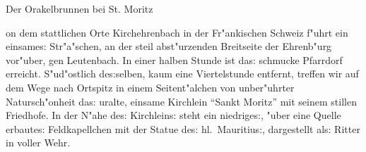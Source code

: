 \documentclass[a4paper]{article}
\begin{document}
\begin{minipage}{9.5cm}
\large\fraklines
\centerline{{\Large\swabfamily Der Orakelbrunnen bei St. Moritz}}%
\vspace{.5cm}

\frakfamily
{}on dem stattlichen Orte Kirchehrenbach in der Fr"ankischen
Schweiz f"uhrt ein einsames:  Str"a"schen, an der steil ab\-st"ur\-zen\-den
Breitseite der Ehrenb"urg vor"uber, gen Leutenbach.  In einer halben
Stunde ist das:  schmucke Pfarrdorf erreicht.  S"ud"ostlich des:selben,
kaum eine Viertelstunde entfernt, treffen wir auf dem Wege nach 
Ortspitz
in einem Seitent"alchen von unber"uhrter Natursch"onheit das:  uralte,
einsame Kirchlein "`Sankt Moritz"' mit seinem stillen Friedhofe.  In der
N"ahe des:  Kirchleins:  steht ein niedriges:, "uber eine Quelle
erbautes:  Feld\-kapellchen mit der Statue des:  hl.~Mauritius:,
dargestellt als:  Ritter in voller Wehr.  
\par
\end{minipage} 

\end{document}
